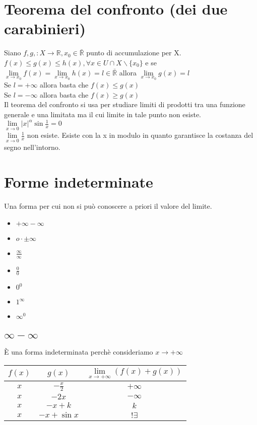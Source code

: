 \section{Teorema del confronto (dei due carabinieri)}
Siano $f,g,: X\rightarrow\mathbb{R}, x_0\in\bar{\mathbb{R}}$ punto di accumulazione per X.\\
$f(x)\le g(x)\le h(x), \forall x\in U\cap X\backslash\{x_0\}$ e se $\lim\limits_{x \rightarrow x_0} f(x)=\lim\limits_{x \rightarrow x_0} h(x)=l\in\bar{\mathbb{R}}$ allora $\lim\limits_{x \rightarrow x_0} g(x)=l$\\
Se $l=+\infty$ allora basta che $f(x)\le g(x)$\\
Se $l=-\infty$ allora basta che $f(x)\ge g(x)$\\
Il teorema del confronto si usa per studiare limiti di prodotti tra una funzione generale e una limitata ma il cui limite in tale punto non esiste.\\
$\lim\limits_{x\rightarrow 0} |x|^\alpha \sin\frac{1}{x}=0$\\
$\lim\limits_{x\rightarrow 0}\frac{1}{x}$ non esiste. Esiste con la x in modulo in quanto garantisce la costanza del segno nell'intorno.
\section{Forme indeterminate}
Una forma per cui non si pu\`o conoscere a priori il valore del limite.
\begin{itemize}
\item $+\infty-\infty$
\item $o\cdot\pm\infty$
\item $\frac{\infty}{\infty}$
\item $\frac{0}{0}$
\item $0^0$
\item $1^{\infty}$
\item $\infty^0$
\end{itemize}
\subsection{$\infty-\infty$}
\`E una forma indeterminata perch\`e consideriamo $x\rightarrow +\infty$
\\
\begin{tabular}{|c|c|c|}
\hline
$f(x)$ & $g(x)$ & $\lim\limits_{x\rightarrow +\infty} (f(x)+g(x))$\\
\hline
$x$ & $-\frac{x}{2}$ & $+\infty$\\
\hline
$x$ & $-2x$ & $-\infty$\\
\hline
$x$ & $-x+k$ & $k$\\
\hline
$x$ & $-x+\sin x$& $!\exists$\\ 
\hline
\end{tabular}
